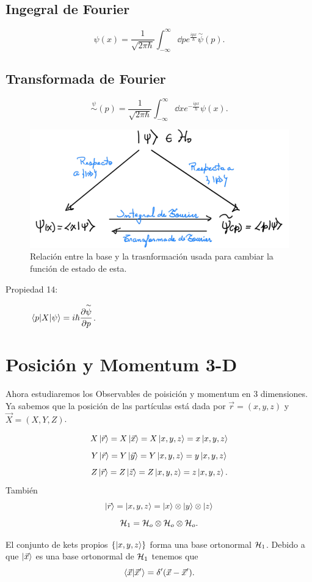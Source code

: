 \subsection{Ingegral de Fourier}
    $$ \psi (x) = \frac{1}{\sqrt{2\pi \hbar}} \int _{-\infty} ^\infty \dd{p} e^{\frac{ipx}{\hbar}} \overset{\sim}{\psi} (p). $$

\subsection{Transformada de Fourier}
    $$ \overset{\psi}{\sim} (p) = \frac{1}{\sqrt{2\pi \hbar}} \int _{-\infty} ^\infty \dd{x} e^{-\frac{ipx}{\hbar}} \psi (x). $$

\begin{figure}[H]
    \centering
    \includegraphics[scale=0.5]{img/transformadaFourier.png}
    \caption{Relación entre la base y la trasnformación usada para cambiar la función de estado de esta.}
    \label{fig:fourier}
\end{figure}

\begin{description}
    \item[Propiedad 14: ] $\mel{p}{X}{\psi} = i\hbar \displaystyle\pdv{\overset{\sim}{\psi}}{p}$. 
\end{description}



\section{Posición y Momentum 3-D}
Ahora estudiaremos los Observables de poisición y momentum en 3 dimensiones. Ya sabemos que la posición de las partículas está dada por $\vec{r} = (x,y,z)$ y $\vec{X} = (X,Y,Z)$.
\begin{tcolorbox}
        $$ X \ket{\vec{r}} = X \ket{\vec{x}} = X\ket{x,y,z} = x\ket{x,y,z} $$
        $$ Y \ket{\vec{r}} = Y \ket{\vec{y}} = Y\ket{x,y,z} = y\ket{x,y,z} $$
        $$ Z \ket{\vec{r}} = Z \ket{\vec{z}} = Z\ket{x,y,z} = z\ket{x,y,z}. $$
    También
        $$ \ket{\vec{r}} = \ket{x,y,z} = \ket{x} \otimes \ket{y} \otimes \ket{z} $$
        $$ \mathcal{H} _1 = \mathcal{H} _o \otimes \mathcal{H} _o \otimes \mathcal{H} _o. $$
\end{tcolorbox}
El conjunto de kets propios $\{ \ket{x,y,z} \}$ forma una base ortonormal $\mathcal{H} _1$. Debido a que $\ket{\vec{x}}$ es una base ortonormal de $\mathcal{H} _1$ tenemos que
    $$ \braket{\vec{x}}{\vec{x}'} = \delta ' (\vec{x} - \vec{x}'). $$
   

